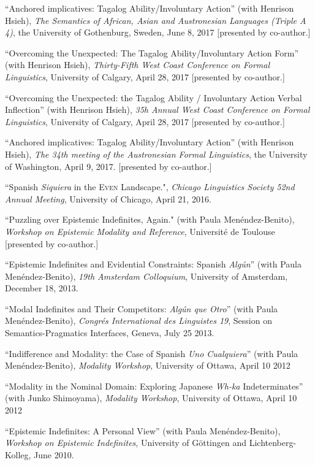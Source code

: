 \documentclass[11pt]{article}
\begin{document}
``Anchored implicatives: Tagalog Ability/Involuntary Action'' (with Henrison Hsieh), \textit{The Semantics of African, Asian and Austronesian Languages (Triple A 4)}, the University of Gothenburg, Sweden, June 8, 2017 [presented by co-author.]

``Overcoming the Unexpected: The Tagalog Ability/Involuntary Action Form'' (with Henrison Hsieh),  \textit{Thirty-Fifth West Coast Conference on Formal Linguistics}, University of Calgary, April 28, 2017 [presented by co-author.]

``Overcoming the Unexpected: the Tagalog Ability / Involuntary Action Verbal Inflection'' (with Henrison Hsieh), \textit{35h Annual West Coast Conference on Formal Linguistics}, University of Calgary, April 28, 2017 [presented by co-author.]

``Anchored implicatives: Tagalog Ability/Involuntary Action'' (with Henrison Hsieh), \textit{The 34th meeting of the Austronesian Formal Linguistics}, the University of Washington, April 9, 2017. [presented by co-author.]

``Spanish \textit{Siquiera} in the \textsc{Even} Landscape.", \textit{Chicago Linguistics Society 52nd Annual Meeting}, University of Chicago, April 21, 2016. 

``Puzzling over Epistemic Indefinites, Again." (with Paula
Men\'endez-Benito), \textit{Workshop on Epistemic Modality and Reference}, Universit\'e de Toulouse [presented by co-author.]

``Epistemic Indefinites and Evidential Constraints:
Spanish \textit{Alg\'un}''  (with Paula
Men\'endez-Benito), \textit{19th Amsterdam Colloquium}, University of Amsterdam,
December 18, 2013.

``Modal Indefinites and Their Competitors: \textit{Alg\'un
  que Otro}'' (with Paula
Men\'endez-Benito), \textit{Congr\'es International des Linguistes 19},
Session on Semantics-Pragmatics Interfaces, Geneva, July 25 2013.

``Indifference and Modality: the Case of Spanish \textit{Uno
Cualquiera}'' (with Paula
Men\'endez-Benito), \textit{Modality Workshop}, University of Ottawa, April 10 2012

``Modality in the Nominal Domain: Exploring Japanese
\textit{Wh-ka} Indeterminates'' (with Junko Shimoyama), \textit{Modality Workshop}, University of Ottawa, April 10 2012

``Epistemic Indefinites: A Personal View'' (with Paula
Men\'endez-Benito), \textit{Workshop on Epistemic Indefinites},
University of G\"{o}ttingen and Lichtenberg-Kolleg, June 2010.
\end{document}
